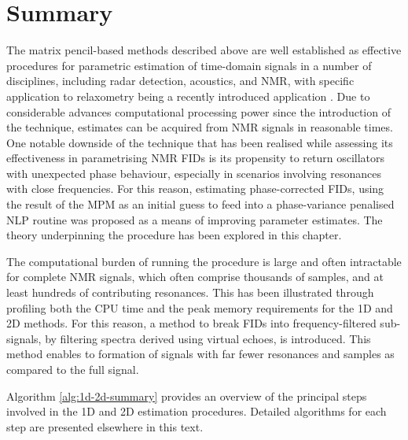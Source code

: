 \section{Summary}
The matrix pencil-based methods described above are well established as
effective procedures for parametric estimation of time-domain signals in a
number of disciplines, including radar detection\cite{Hua1994},
acoustics\cite{TODO}, and \ac{NMR}\cite{Lin1997}, with specific application to
relaxometry being a recently introduced application \cite{Fricke2020,
Wortge2023}. Due to considerable advances computational processing power since
the introduction of the technique, estimates can be acquired from \ac{NMR}
signals in reasonable times. One notable downside of the technique that has
been realised while assessing its effectiveness in parametrising \ac{NMR}
\ac{FID}s is its propensity to return oscillators with unexpected phase
behaviour, especially in scenarios involving resonances with close frequencies.
For this reason, estimating phase-corrected \acp{FID}, using the result of the
\ac{MPM} as an initial guess to feed into a phase-variance penalised \ac{NLP}
routine was proposed as a means of improving parameter estimates. The theory
underpinning the procedure has been explored in this chapter.

The computational burden of running the procedure is large and often
intractable for complete \ac{NMR} signals, which often comprise thousands of
samples, and at least hundreds of contributing resonances. This has been
illustrated through profiling both the \ac{CPU} time and the peak memory
requirements for the \ac{1D} and \ac{2D} methods.  For this reason, a method to break \acp{FID} into
frequency-filtered sub-signals, by filtering spectra derived using virtual
echoes, is introduced.  This method enables to formation of signals with far
fewer resonances and samples as compared to the full signal.

Algorithm \ref{alg:1d-2d-summary} provides an overview of the principal steps
involved in the \ac{1D} and \ac{2D} estimation procedures. Detailed algorithms
for each step are presented elsewhere in this text.


